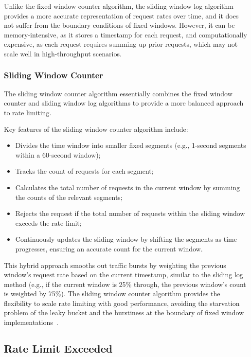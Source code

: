 Unlike the fixed window counter algorithm,
the sliding window log algorithm provides a more accurate representation of request rates over time,
and it does not suffer from the boundary conditions of fixed windows.
However, it can be memory-intensive, as it stores a timestamp for each request, and computationally expensive,
as each request requires summing up prior requests, which may not scale well in high-throughput scenarios.

\subsubsection{Sliding Window Counter}\label{subsubsec:sliding-window-counter-algorithm}

The sliding window counter algorithm essentially combines the fixed window counter and sliding window log algorithms to provide a more balanced approach to rate limiting.

Key features of the sliding window counter algorithm include:

\begin{itemize}
    \item Divides the time window into smaller fixed segments (e.g., 1-second segments within a 60-second window);
    \item Tracks the count of requests for each segment;
    \item Calculates the total number of requests in the current window by summing the counts of the relevant segments;
    \item Rejects the request if the total number of requests within the sliding window exceeds the rate limit;
    \item Continuously updates the sliding window by shifting the segments as time progresses, ensuring an accurate count for the current window.
\end{itemize}

This hybrid approach smooths out traffic bursts
by weighting the previous window’s request rate based on the current timestamp,
similar to the sliding log method
(e.g., if the current window is 25\% through, the previous window's count is weighted by 75\%).
The sliding window counter algorithm provides the flexibility to scale rate limiting with good performance,
avoiding the starvation problem of the leaky bucket and the burstiness at the boundary of fixed window implementations~\cite{kong-rate-limiting}.

\subsection{Rate Limit Exceeded}\label{subsec:rate-limiter-exceeded}

